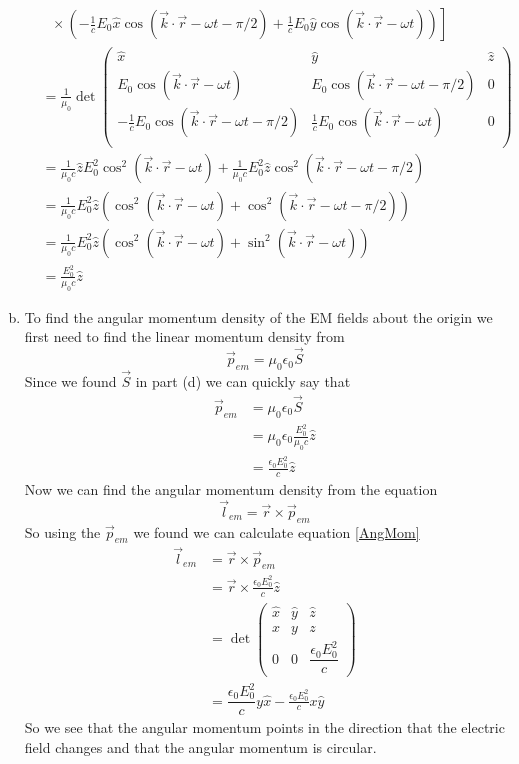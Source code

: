 \documentclass[11pt]{article}
\numberwithin{equation}{section}
\begin{document}
\begin{enumerate}[(a)]
\begin{align*}
&\left. \ \ \ \times\left(-\frac{1}{c}E_0\hat{x}\cos(\vec{k}\cdot\vec{r}-\omega t-\pi/2) + \frac{1}{c}E_0\hat{y}\cos(\vec{k}\cdot\vec{r}-\omega t)\right)\right]\\
&= \frac{1}{\mu_0}\det\left(\begin{array}{ccc}
	\hat{x}		&\hat{y}		&\hat{z}\\
	E_0\cos(\vec{k}\cdot\vec{r}-\omega t)	&E_0\cos(\vec{k}\cdot\vec{r}-\omega t-\pi/2)	&0\\
	-\frac{1}{c}E_0\cos(\vec{k}\cdot\vec{r}-\omega t-\pi/2)	&\frac{1}{c}E_0\cos(\vec{k}\cdot\vec{r}-\omega t)	&0\\
	\end{array}\right)\\
&= \frac{1}{\mu_0c}\hat{z}E_0^2\cos^2(\vec{k}\cdot\vec{r}-\omega t) + \frac{1}{\mu_0c}E_0^2\hat{z}\cos^2(\vec{k}\cdot\vec{r}-\omega t-\pi/2)\\
&= \frac{1}{\mu_0c}E_0^2\hat{z}\left(\cos^2(\vec{k}\cdot\vec{r}-\omega t) +\cos^2(\vec{k}\cdot\vec{r}-\omega t-\pi/2)\right)\\
&= \frac{1}{\mu_0c}E_0^2\hat{z}\left(\cos^2(\vec{k}\cdot\vec{r}-\omega t) +\sin^2(\vec{k}\cdot\vec{r}-\omega t)\right)\\
&= \frac{E_0^2}{\mu_0c}\hat{z}
\end{align*}

\item
To find the angular momentum density of the EM fields about the origin we first need to find the linear momentum density from
\begin{equation}
\vec{p}_{em} = \mu_0\epsilon_0\vec{S}
\label{LinMom}
\end{equation}
Since we found $\vec{S}$ in part (d) we can quickly say that
\begin{align*}
\vec{p}_{em} &= \mu_0\epsilon_0\vec{S}\\
&= \mu_0\epsilon_0\frac{E_0^2}{\mu_0c}\hat{z}\\
&= \frac{\epsilon_0E_0^2}{c}\hat{z}
\end{align*}
Now we can find the angular momentum density from the equation
\begin{equation}
\vec{l}_{em} = \vec{r}\times\vec{p}_{em}
\label{AngMom}
\end{equation}
So using the $\vec{p}_{em}$ we found we can calculate equation \ref{AngMom}
\begin{align*}
\vec{l}_{em} &= \vec{r}\times\vec{p}_{em}\\
&= \vec{r}\times\frac{\epsilon_0E_0^2}{c}\hat{z}\\
&= \det\left(\begin{array}{ccc}
	\hat{x}		&\hat{y}		&\hat{z}\\
	x		&y			&z\\
	0		&0			&\dfrac{\epsilon_0E_0^2}{c}
\end{array}\right)\\
&= \dfrac{\epsilon_0E_0^2}{c}y\hat{x} - \frac{\epsilon_0E_0^2}{c}x\hat{y}
\end{align*}
So we see that the angular momentum points in the direction that the electric field changes and that the angular momentum is circular.
\end{enumerate}
\end{document}
